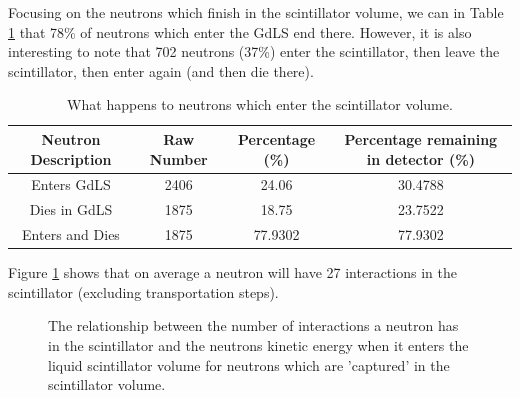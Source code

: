 \par
Focusing on the neutrons which finish in the scintillator volume, we can in Table \ref{tab:Where_gdls_neutrons_go} that 78\% of neutrons which enter the GdLS end there.
However, it is also interesting to note that 702 neutrons (37\%) enter the scintillator, then leave the scintillator, then enter again (and then die there).

\begin{table}[!htbp]
    \centering
    \begin{tabular}{c | c | c | c }
    \hline
    {Neutron Description}  & {Raw Number} & {Percentage (\%)} & {Percentage remaining in detector (\%)} \\ \hline
    Enters GdLS            &     2406     & 24.06                           & 30.4788 \\
    Dies in GdLS           &     1875     & 18.75                           & 23.7522 \\
    Enters and Dies        &     1875     & 77.9302                         & 77.9302
    
    \end{tabular}
    \caption{What happens to neutrons which enter the scintillator volume.}
    \label{tab:Where_gdls_neutrons_go}
\end{table} 

\par
Figure \ref{fig:dd_neutron_gdls_kinetic_energy_vs_number_of_interactions} shows that on average a neutron will have 27 interactions in the scintillator (excluding transportation steps).


\begin{figure}[!htbp]%
\centering
{}
\caption{The relationship between the number of interactions a neutron has in the scintillator and the neutrons kinetic energy when it enters the liquid scintillator volume for neutrons which are 'captured' in the scintillator volume.
}
\label{fig:dd_neutron_gdls_kinetic_energy_vs_number_of_interactions}
\end{figure}


